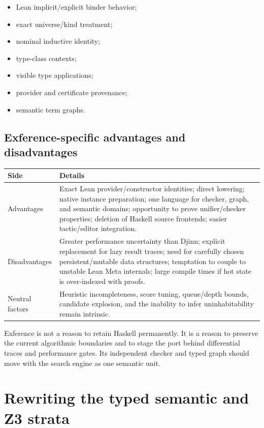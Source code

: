 \documentclass[10pt,letterpaper,oneside]{report}
\begin{document}
\begin{itemize}
  \item Lean implicit/explicit binder behavior;
  \item exact universe/kind treatment;
  \item nominal inductive identity;
  \item type-class contexts;
  \item visible type applications;
  \item provider and certificate provenance;
  \item semantic term graphs.
\end{itemize}

\section{Exference-specific advantages and disadvantages}

\begin{longtable}{@{}L{0.18\textwidth}L{0.74\textwidth}@{}}
\toprule
\textbf{Side} & \textbf{Details} \\
\midrule
\endhead
Advantages & Exact Lean provider/constructor identities; direct lowering; native instance preparation; one language for checker, graph, and semantic domains; opportunity to prove unifier/checker properties; deletion of Haskell source frontends; easier tactic/editor integration. \\
Disadvantages & Greater performance uncertainty than Djinn; explicit replacement for lazy result traces; need for carefully chosen persistent/mutable data structures; temptation to couple to unstable Lean Meta internals; large compile times if hot state is over-indexed with proofs. \\
Neutral factors & Heuristic incompleteness, score tuning, queue/depth bounds, candidate explosion, and the inability to infer uninhabitability remain intrinsic. \\
\bottomrule
\end{longtable}

\begin{summarybox}
Exference is not a reason to retain Haskell permanently. It is a reason to preserve the current algorithmic boundaries and to stage the port behind differential traces and performance gates. Its independent checker and typed graph should move with the search engine as one semantic unit.
\end{summarybox}

\chapter{Rewriting the typed semantic and Z3 strata}\label{ch:semantic}
\end{document}
